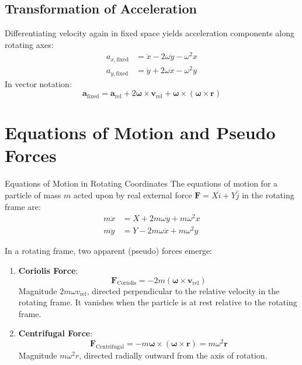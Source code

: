 \subsection{Transformation of Acceleration}
Differentiating velocity again in fixed space yields acceleration components along rotating axes:
\begin{align}
    a_{x,\text{fixed}} &= \ddot{x} - 2\omega \dot{y} - \omega^2 x \\
    a_{y,\text{fixed}} &= \ddot{y} + 2\omega \dot{x} - \omega^2 y
\end{align}
In vector notation:
\begin{equation}
    \mathbf{a}_{\text{fixed}} = \mathbf{a}_{\text{rel}} + 2 \mathbf{\omega} \times \mathbf{v}_{\text{rel}} + \mathbf{\omega} \times (\mathbf{\omega} \times \mathbf{r})
\end{equation}

\section{Equations of Motion and Pseudo Forces}

\begin{theorembox}{Equations of Motion in Rotating Coordinates}
The equations of motion for a particle of mass $m$ acted upon by real external force $\mathbf{F} = X \hat{i} + Y \hat{j}$ in the rotating frame are:
\begin{align}
    m \ddot{x} &= X + 2 m \omega \dot{y} + m \omega^2 x \label{eq:rot_x} \\
    m \ddot{y} &= Y - 2 m \omega \dot{x} + m \omega^2 y \label{eq:rot_y}
\end{align}
\end{theorembox}

\begin{keybox}
In a rotating frame, two apparent (pseudo) forces emerge:
\begin{enumerate}[leftmargin=1.5em]
    \item \textbf{Coriolis Force}:
    \begin{equation}
        \mathbf{F}_{\text{Coriolis}} = -2 m (\mathbf{\omega} \times \mathbf{v}_{\text{rel}})
    \end{equation}
    Magnitude $2m\omega v_{\text{rel}}$, directed perpendicular to the relative velocity in the rotating frame. It vanishes when the particle is at rest relative to the rotating frame.
    \item \textbf{Centrifugal Force}:
    \begin{equation}
        \mathbf{F}_{\text{Centrifugal}} = -m \mathbf{\omega} \times (\mathbf{\omega} \times \mathbf{r}) = m \omega^2 \mathbf{r}
    \end{equation}
    Magnitude $m\omega^2 r$, directed radially outward from the axis of rotation.
\end{enumerate}
\end{keybox}

